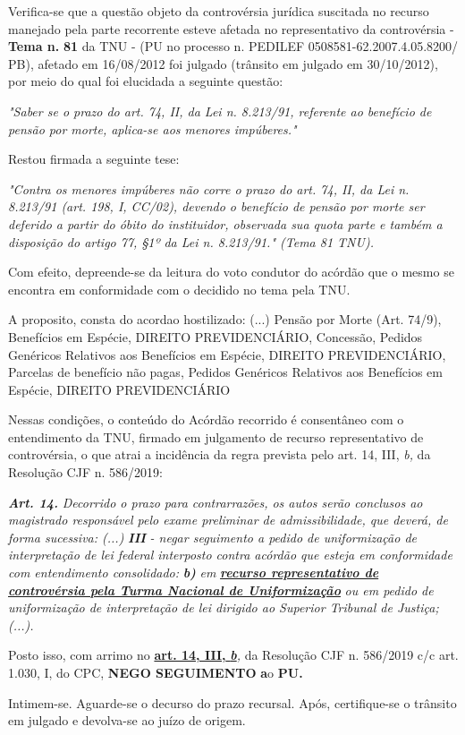 \documentclass[12pt]{article}
\begin{document}
\justifying
\noindent Verifica-se que a questão objeto da controvérsia jurídica suscitada no recurso manejado pela parte recorrente esteve afetada no representativo da controvérsia - \textbf{Tema n. }\textbf{81} da TNU - (PU no processo n. PEDILEF 0508581-62.2007.4.05.8200/ PB),  afetado em 16/08/2012 foi julgado (trânsito em julgado em 30/10/2012), por meio do qual foi elucidada a seguinte questão:

\noindent \textit{"Saber se o prazo do art. 74, II, da Lei n. 8.213/91, referente ao benefício de pensão por morte, aplica-se aos menores impúberes."}

\noindent Restou firmada a seguinte tese:

\noindent \textit{"Contra os menores impúberes não corre o prazo do art. 74, II, da Lei n. 8.213/91 (art. 198, I, CC/02), devendo o benefício de pensão por morte ser deferido a partir do óbito do instituidor, observada sua quota parte e também a disposição do artigo 77, §1º da Lei n. 8.213/91." (Tema 81 TNU).}

\noindent Com efeito, depreende-se da leitura do voto condutor do acórdão que o mesmo se encontra em conformidade com o decidido no  tema pela TNU.

\noindent A proposito, consta do acordao hostilizado: (...) Pensão por Morte (Art. 74/9), Benefícios em Espécie, DIREITO PREVIDENCIÁRIO, Concessão, Pedidos Genéricos Relativos aos Benefícios em Espécie, DIREITO PREVIDENCIÁRIO, Parcelas de benefício não pagas, Pedidos Genéricos Relativos aos Benefícios em Espécie, DIREITO PREVIDENCIÁRIO

\noindent Nessas condições, o conteúdo do Acórdão recorrido é consentâneo com o entendimento da TNU, firmado em julgamento de recurso representativo de controvérsia, o que atrai a incidência da regra prevista pelo art. 14, III, \textit{b,} da Resolução CJF n. 586/2019:

\noindent \textit{\textbf{Art. 14.}}\textit{ Decorrido o prazo para contrarrazões, os autos serão conclusos ao magistrado responsável pelo exame preliminar de admissibilidade, que deverá, de forma sucessiva: (...) }\textit{\textbf{III }}\textit{- negar seguimento a pedido de uniformização de interpretação de lei federal interposto contra acórdão que esteja em conformidade com entendimento consolidado: }\textit{\textbf{b)}}\textit{ em }\uline{\textit{\textbf{recurso representativo de controvérsia pela Turma Nacional de Uniformização}}}\textit{ ou em pedido de uniformização de interpretação de lei dirigido ao Superior Tribunal de Justiça;(...).}

\noindent Posto isso, com arrimo no \uline{\textbf{art. 14, III, }}\uline{\textit{\textbf{b}}}\textit{,} da Resolução CJF n. 586/2019 c/c art. 1.030, I, do CPC, \textbf{NEGO SEGUIMENTO }\textbf{a}o\textbf{ PU}\textbf{.}

\noindent Intimem-se. Aguarde-se o decurso do prazo recursal. Após, certifique-se o trânsito em julgado e devolva-se ao juízo de origem.
\end{document}

